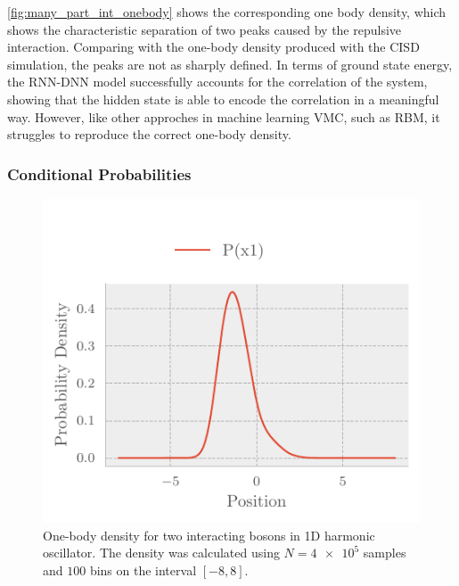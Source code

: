 \autoref{fig:many_part_int_onebody} shows the corresponding one body density,
which shows the characteristic separation of two peaks caused by the repulsive
interaction. Comparing with the one-body density produced with the CISD
simulation, the peaks are not as sharply defined. In terms of ground state
energy, the RNN-DNN model successfully accounts for the correlation of the
system, showing that the hidden state is able to encode the correlation in a
meaningful way. However, like other approches in machine learning VMC, such as
RBM, it struggles to reproduce the correct one-body density.  

\subsubsection{Conditional Probabilities}

\begin{figure}[H]
	\includegraphics[]{figures/many_part_con1.pdf}
	\caption{One-body density for two interacting bosons in 1D harmonic
      oscillator. The density was calculated using $N=\num{4e5}$ samples and $100$
      bins on the interval $[-8,8]$.} 
	\label{fig:many_part_con1}
\end{figure}

